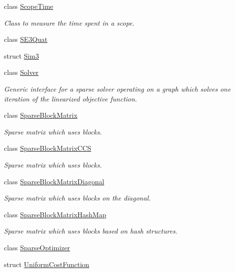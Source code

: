\begin{DoxyCompactItemize}
class \mbox{\hyperlink{classg2o_1_1_scope_time}{Scope\+Time}}
\begin{DoxyCompactList}\small\item\em Class to measure the time spent in a scope. \end{DoxyCompactList}\item 
class \mbox{\hyperlink{classg2o_1_1_s_e3_quat}{S\+E3\+Quat}}
\item 
struct \mbox{\hyperlink{structg2o_1_1_sim3}{Sim3}}
\item 
class \mbox{\hyperlink{classg2o_1_1_solver}{Solver}}
\begin{DoxyCompactList}\small\item\em Generic interface for a sparse solver operating on a graph which solves one iteration of the linearized objective function. \end{DoxyCompactList}\item 
class \mbox{\hyperlink{classg2o_1_1_sparse_block_matrix}{Sparse\+Block\+Matrix}}
\begin{DoxyCompactList}\small\item\em Sparse matrix which uses blocks. \end{DoxyCompactList}\item 
class \mbox{\hyperlink{classg2o_1_1_sparse_block_matrix_c_c_s}{Sparse\+Block\+Matrix\+C\+CS}}
\begin{DoxyCompactList}\small\item\em Sparse matrix which uses blocks. \end{DoxyCompactList}\item 
class \mbox{\hyperlink{classg2o_1_1_sparse_block_matrix_diagonal}{Sparse\+Block\+Matrix\+Diagonal}}
\begin{DoxyCompactList}\small\item\em Sparse matrix which uses blocks on the diagonal. \end{DoxyCompactList}\item 
class \mbox{\hyperlink{classg2o_1_1_sparse_block_matrix_hash_map}{Sparse\+Block\+Matrix\+Hash\+Map}}
\begin{DoxyCompactList}\small\item\em Sparse matrix which uses blocks based on hash structures. \end{DoxyCompactList}\item 
class \mbox{\hyperlink{classg2o_1_1_sparse_optimizer}{Sparse\+Optimizer}}
\item 
struct \mbox{\hyperlink{structg2o_1_1_uniform_cost_function}{Uniform\+Cost\+Function}}

\end{DoxyCompactItemize}
